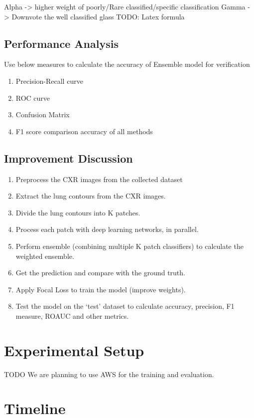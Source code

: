 \documentclass{sigkddExp}
\begin{document}
Alpha -> higher weight of poorly/Rare classified/specific classification
Gamma -> Downvote the well classified glass
TODO: Latex formula

\subsection{Performance Analysis}
Use below measures to calculate the accuracy of Ensemble model for verification

\begin{enumerate}
       \item Precision-Recall curve
       \item ROC curve
       \item Confusion Matrix
       \item F1 score comparison accuracy of all methods 
\end{enumerate}



\subsection{Improvement Discussion}
\begin{enumerate}
       \item Preprocess the CXR images from the collected dataset 
\item Extract the lung contours from the CXR images.
\item Divide the lung contours into K patches.
\item Process each patch with deep learning networks, in parallel.
\item Perform ensemble (combining multiple K patch classifiers) to calculate the weighted ensemble.
\item Get the prediction and compare with the ground truth.
\item Apply Focal Loss to train the model (improve weights).
\item Test the model on the ‘test’ dataset to calculate accuracy, precision, F1 measure, ROAUC and other metrics.
\end{enumerate}


\section{Experimental Setup}
TODO
We are planning to use AWS for the training and evaluation.

\section{Timeline}
\end{document}
